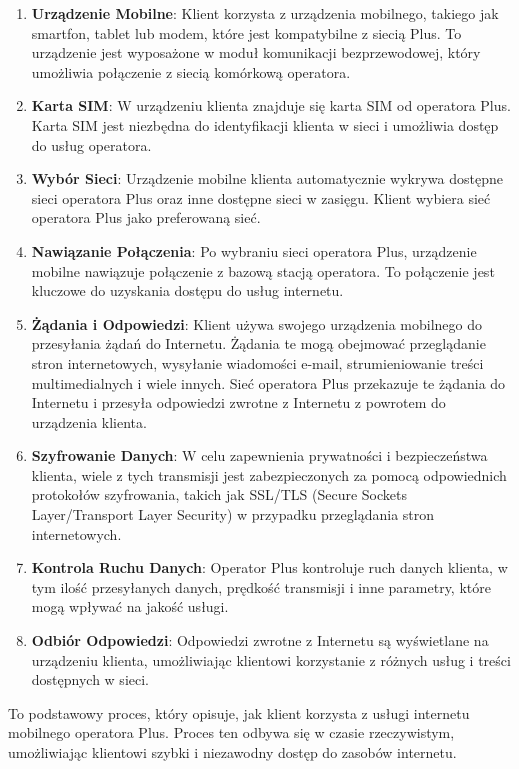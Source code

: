    \begin{enumerate}
        \item \textbf{Urządzenie Mobilne}: Klient korzysta z urządzenia mobilnego, takiego jak smartfon, tablet lub modem, które jest kompatybilne z siecią Plus. To urządzenie jest wyposażone w moduł komunikacji bezprzewodowej, który umożliwia połączenie z siecią komórkową operatora.
    
        \item \textbf{Karta SIM}: W urządzeniu klienta znajduje się karta SIM od operatora Plus. Karta SIM jest niezbędna do identyfikacji klienta w sieci i umożliwia dostęp do usług operatora.
    
        \item \textbf{Wybór Sieci}: Urządzenie mobilne klienta automatycznie wykrywa dostępne sieci operatora Plus oraz inne dostępne sieci w zasięgu. Klient wybiera sieć operatora Plus jako preferowaną sieć.
    
        \item \textbf{Nawiązanie Połączenia}: Po wybraniu sieci operatora Plus, urządzenie mobilne nawiązuje połączenie z bazową stacją operatora. To połączenie jest kluczowe do uzyskania dostępu do usług internetu.
    
        \item \textbf{Żądania i Odpowiedzi}: Klient używa swojego urządzenia mobilnego do przesyłania żądań do Internetu. Żądania te mogą obejmować przeglądanie stron internetowych, wysyłanie wiadomości e-mail, strumieniowanie treści multimedialnych i wiele innych. Sieć operatora Plus przekazuje te żądania do Internetu i przesyła odpowiedzi zwrotne z Internetu z powrotem do urządzenia klienta.
    
        \item \textbf{Szyfrowanie Danych}: W celu zapewnienia prywatności i bezpieczeństwa klienta, wiele z tych transmisji jest zabezpieczonych za pomocą odpowiednich protokołów szyfrowania, takich jak SSL/TLS (Secure Sockets Layer/Transport Layer Security) w przypadku przeglądania stron internetowych.
    
        \item \textbf{Kontrola Ruchu Danych}: Operator Plus kontroluje ruch danych klienta, w tym ilość przesyłanych danych, prędkość transmisji i inne parametry, które mogą wpływać na jakość usługi.
    
        \item \textbf{Odbiór Odpowiedzi}: Odpowiedzi zwrotne z Internetu są wyświetlane na urządzeniu klienta, umożliwiając klientowi korzystanie z różnych usług i treści dostępnych w sieci.
    
    \end{enumerate}
    
    To podstawowy proces, który opisuje, jak klient korzysta z usługi internetu mobilnego operatora Plus. Proces ten odbywa się w czasie rzeczywistym, umożliwiając klientowi szybki i niezawodny dostęp do zasobów internetu.
    
    

\pagebreak